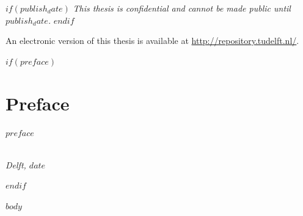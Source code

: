 \documentclass[whitelogo]{tudelft-report}
\begin{document}
\begin{titlepage}
\begin{center}
$if(publish_date)$
\bigskip
\bigskip
\emph{This thesis is confidential and cannot be made public until $publish_date$.}
$endif$

\bigskip
\bigskip
An electronic version of this thesis is available at \url{http://repository.tudelft.nl/}.



\end{center}


\end{titlepage}

$if(preface)$
\chapter*{Preface}

$preface$

\begin{flushright}
{\makeatletter\itshape
    \@author \\
    Delft, $date$
\makeatother}
\end{flushright}

$endif$

\setcounter{tocdepth}{1}
\tableofcontents

\mainmatter

$body$

\appendix

%

\nocite{*}

% 


\end{document}
